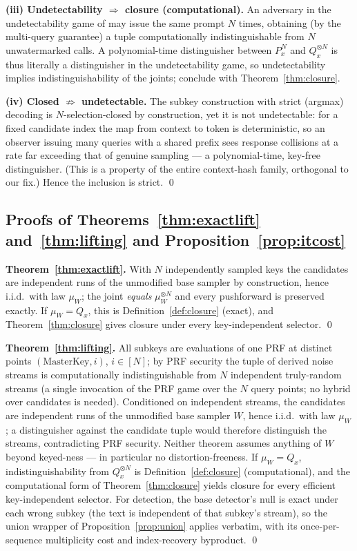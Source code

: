 \documentclass{article} %
\begin{document}
\textbf{(iii) Undetectability $\Rightarrow$ closure (computational).} An
adversary in the undetectability game of \citet{christ2023undetectable} may issue
the same prompt $N$ times, obtaining (by the multi-query guarantee) a tuple
computationally indistinguishable from $N$ unwatermarked calls. A
polynomial-time distinguisher between $P_x^{N}$ and $Q_x^{\otimes N}$ is thus
literally a distinguisher in the undetectability game, so undetectability
implies indistinguishability of the joints; conclude with
Theorem~\ref{thm:closure}.

\textbf{(iv) Closed $\not\Rightarrow$ undetectable.} The subkey construction with
strict (argmax) decoding is $N$-selection-closed by construction, yet it is not
undetectable: for a fixed candidate index the map from context to token is
deterministic, so an observer issuing many queries with a shared prefix sees
response collisions at a rate far exceeding that of genuine sampling --- a
polynomial-time, key-free distinguisher. (This is a property of the entire
context-hash family, orthogonal to our fix.) Hence the inclusion is strict.
\qed

\subsection{Proofs of Theorems~\ref{thm:exactlift} and~\ref{thm:lifting} and Proposition~\ref{prop:itcost}}
\textbf{Theorem~\ref{thm:exactlift}.} With $N$ independently sampled keys the
candidates are independent runs of the unmodified base sampler by
construction, hence i.i.d.\ with law $\mu_W$; the joint \emph{equals}
$\mu_W^{\otimes N}$ and every pushforward is preserved exactly. If
$\mu_W=Q_x$, this is Definition~\ref{def:closure} (exact), and
Theorem~\ref{thm:closure} gives closure under every key-independent selector.
\qed

\textbf{Theorem~\ref{thm:lifting}.} All subkeys are evaluations of one PRF at
distinct points
$(\mathrm{MasterKey},i)$, $i\in[N]$; by PRF security the tuple of derived noise
streams is computationally indistinguishable from $N$ independent truly-random
streams (a single invocation of the PRF game over the $N$ query points; no
hybrid over candidates is needed). Conditioned on independent streams, the
candidates are independent runs of the unmodified base sampler $W$, hence
i.i.d.\ with law $\mu_W$; a distinguisher against the candidate tuple would
therefore distinguish the streams, contradicting PRF security. Neither
theorem assumes anything of $W$ beyond keyed-ness --- in particular no
distortion-freeness. If $\mu_W=Q_x$, indistinguishability from
$Q_x^{\otimes N}$ is Definition~\ref{def:closure} (computational), and the
computational form of Theorem~\ref{thm:closure} yields closure for every
efficient key-independent selector. For detection, the base detector's null is
exact under each wrong subkey (the text is independent of that subkey's
stream), so the union wrapper of
Proposition~\ref{prop:union} applies verbatim, with its once-per-sequence
multiplicity cost and index-recovery byproduct. \qed
\end{document}
